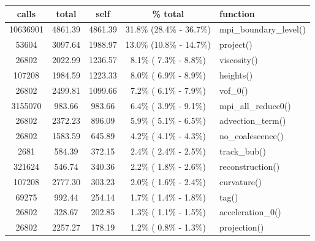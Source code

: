 \begin{table}  
\begin{tabular}{c|c|c|c|l}
  calls  &  total  &   self  & \% total  & function \\ \hline
  10636901 &  4861.39 &  4861.39  &   31.8\% (28.4\% - 36.7\%) &   mpi\_boundary\_level()\\%
     53604 &  3097.64 &  1988.97  &   13.0\% (10.8\% - 14.7\%) &   project()\\%
     26802 &  2022.99 &  1236.57  &    8.1\% ( 7.3\% -  8.8\%) &   viscosity()\\%
    107208 &  1984.59 &  1223.33  &    8.0\% ( 6.9\% -  8.9\%) &   heights()\\%
     26802 &  2499.81 &  1099.66  &    7.2\% ( 6.1\% -  7.9\%) &   vof\_0()\\%
   3155070 &  983.66  & 983.66    &  6.4\% ( 3.9\% -  9.1\%)   & mpi\_all\_reduce0()\\%
     26802 &  2372.23 &  896.09   &   5.9\% ( 5.1\% -  6.5\%)  &  advection\_term()\\%
     26802 &  1583.59 &  645.89   &   4.2\% ( 4.1\% -  4.3\%)  &  no\_coalescence()\\%
      2681 &  584.39  & 372.15    &  2.4\% ( 2.4\% -  2.5\%)   & track\_bub()\\%
    321624 &  546.74  & 340.36    &  2.2\% ( 1.8\% -  2.6\%)   & reconstruction()\\%
    107208 &  2777.30 &  303.23   &   2.0\% ( 1.6\% -  2.4\%)  &  curvature()\\%
     69275 &  992.44  & 254.14    &  1.7\% ( 1.4\% -  1.8\%)   & tag()\\%
     26802 &  328.67  & 202.85    &  1.3\% ( 1.1\% -  1.5\%)   & acceleration\_0()\\%
     26802 &  2257.27 &  178.19   &   1.2\% ( 0.8\% -  1.3\%)  &  projection()\\%

\end{tabular}
\end{table}
